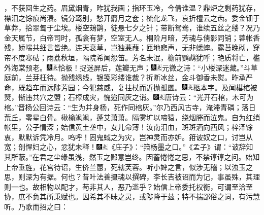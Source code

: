 ，不获回生之药。眉黛烟青，昨犹我画；指环玉冷，今倩谁温？鼎炉之剩药犹存，襟泪之馀痕尚渍。镜分鸾别，愁开麝月之奁；梳化龙飞，哀折檀云之齿。委金钿于草莽，拾翠㔩于尘埃。楼空鳷鹊，徒悬七夕之针；带断鸳鸯，谁续五丝之缕？况乃金天属节，白帝司时，孤衾有梦，空室无人。桐阶月暗，芳魂与倩影同销；蓉帐香残，娇喘共细言皆绝。连天衰草，岂独蒹葭；匝地悲声，无非蟋蟀。露苔晚砌，穿帘不度寒砧；雨荔秋垣，隔院希闻怨笛。芳名未泯，檐前鹦鹉犹呼；艳质将亡，槛外海棠预老。{\includegraphics[width=3mm]{../Images/00004}\includegraphics[width=3mm]{../Images/00012}\footnotesize \kaishu 恰极！}捉迷屏后，莲瓣无声；{\includegraphics[width=3mm]{../Images/00004}\includegraphics[width=3mm]{../Images/00012}\footnotesize \kaishu 元微之诗：“小楼深迷藏。”}斗草庭前，兰芽枉待。抛残绣线，银笺彩缕谁裁？折断冰丝，金斗御香未熨。昨承严命，既趋车而远陟芳园；今犯慈威，复拄杖而近抛孤匶。{\includegraphics[width=3mm]{../Images/00004}\includegraphics[width=3mm]{../Images/00012}\footnotesize \kaishu 柩本字。}及闻槥棺被燹，惭违共穴之盟；石椁成灾，愧迨同灰之诮。{\includegraphics[width=3mm]{../Images/00004}\includegraphics[width=3mm]{../Images/00012}\footnotesize \kaishu 唐诗云：“光开石棺，木可为棺。”晋杨公回诗云：“生为并身杨，死作同棺灰。”}尔乃西风古寺，淹滞青磷；落日荒丘，零星白骨。楸榆飒飒，蓬艾萧萧。隔雾圹以啼猿，绕烟塍而泣鬼。自为红绡帐里，公子情深；始信黄土垄中，女儿命薄！汝南泪血，斑斑洒向西风；梓泽馀衷，默默诉凭冷月。呜呼！固鬼蜮之为灾，岂神灵而亦妒。箝诐奴之口，讨岂从宽；剖悍妇之心，忿犹未释！{{\includegraphics[width=3mm]{../Images/00004}\includegraphics[width=3mm]{../Images/00012}\footnotesize \kaishu 《庄子》：“箝杨墨之口。”《孟子》谓：“诐辞知其所蔽。”}}在君之尘缘虽浅，然玉之鄙意岂终。因蓄惓惓之思，不禁谆谆之问。始知上帝垂旌，花宫待诏，生侪兰蕙，死辖芙蓉。听小婢之言，似涉无稽；以浊玉之思，则深为有据。何也？昔叶法善摄魂以撰碑，李长吉被诏而为记，事虽殊，其理则一也。故相物以配才，苟非其人，恶乃滥乎？始信上帝委托权衡，可谓至洽至协，庶不负其所秉赋也。因希其不昧之灵，或陟降于兹；特不揣鄙俗之词，有污慧听。乃歌而招之曰：
